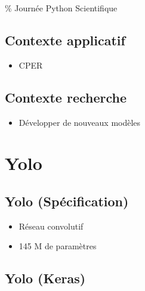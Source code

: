 \% Journée Python Scientifique

\subsection{Contexte applicatif}\label{contexte-applicatif}

\begin{itemize}
\tightlist
\item
  CPER
\end{itemize}

\subsection{Contexte recherche}\label{contexte-recherche}

\begin{itemize}
\tightlist
\item
  Développer de nouveaux modèles
\end{itemize}

\section{Yolo}\label{yolo}

\subsection{Yolo (Spécification)}\label{yolo-spuxe9cification}

\begin{itemize}
\item
  Réseau convolutif
\item
  145 M de paramètres
\end{itemize}

\subsection{Yolo (Keras)}\label{yolo-keras}

